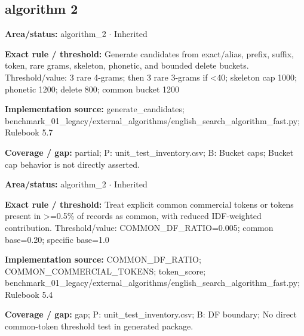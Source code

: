 \begingroup
\setlength{\parskip}{0pt}
\small
\subsection*{algorithm 2}
\begin{tcolorbox}[enhanced,breakable,colback=white,colframe=Muted!45,boxrule=0.45pt,arc=1.5pt,left=6pt,right=6pt,top=5pt,bottom=5pt,title={\texttt{A2-CANDIDATES-09}},title after break={\texttt{A2-CANDIDATES-09}\ (continued)},fonttitle=\headingfont\bfseries\color{Navy},coltitle=Navy]
\textbf{Area/status:} algorithm\_\allowbreak{}2 $\boldsymbol{\cdot}$ Inherited\par
\smallskip
\textbf{Exact rule / threshold:} Generate candidates from exact/\allowbreak{}alias, prefix, suffix, token, rare grams, skeleton, phonetic, and bounded delete buckets. Threshold/\allowbreak{}value: 3 rare 4-grams; then 3 rare 3-grams if <40; skeleton cap 1000; phonetic 1200; delete 800; common bucket 1200\par
\smallskip
\textbf{Implementation source:} generate\_\allowbreak{}candidates; benchmark\_\allowbreak{}01\_\allowbreak{}legacy/\allowbreak{}external\_\allowbreak{}algorithms/\allowbreak{}english\_\allowbreak{}search\_\allowbreak{}algorithm\_\allowbreak{}fast.py; Rulebook 5.7\par
\smallskip
\textbf{Coverage / gap:} partial; P: unit\_\allowbreak{}test\_\allowbreak{}inventory.csv; B: Bucket caps; Bucket cap behavior is not directly asserted.
\end{tcolorbox}
\begin{tcolorbox}[enhanced,breakable,colback=white,colframe=Muted!45,boxrule=0.45pt,arc=1.5pt,left=6pt,right=6pt,top=5pt,bottom=5pt,title={\texttt{A2-COMMON-TOKEN-06}},title after break={\texttt{A2-COMMON-TOKEN-06}\ (continued)},fonttitle=\headingfont\bfseries\color{Navy},coltitle=Navy]
\textbf{Area/status:} algorithm\_\allowbreak{}2 $\boldsymbol{\cdot}$ Inherited\par
\smallskip
\textbf{Exact rule / threshold:} Treat explicit common commercial tokens or tokens present in >=0.5\% of records as common, with reduced IDF-weighted contribution. Threshold/\allowbreak{}value: COMMON\_\allowbreak{}DF\_\allowbreak{}RATIO=0.005; common base=0.20; specific base=1.0\par
\smallskip
\textbf{Implementation source:} COMMON\_\allowbreak{}DF\_\allowbreak{}RATIO; COMMON\_\allowbreak{}COMMERCIAL\_\allowbreak{}TOKENS; token\_\allowbreak{}score; benchmark\_\allowbreak{}01\_\allowbreak{}legacy/\allowbreak{}external\_\allowbreak{}algorithms/\allowbreak{}english\_\allowbreak{}search\_\allowbreak{}algorithm\_\allowbreak{}fast.py; Rulebook 5.4\par
\smallskip
\textbf{Coverage / gap:} gap; P: unit\_\allowbreak{}test\_\allowbreak{}inventory.csv; B: DF boundary; No direct common-token threshold test in generated package.
\end{tcolorbox}
